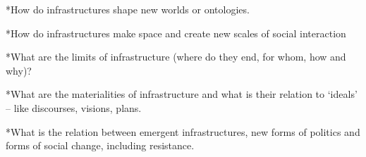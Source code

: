 \documentclass[a4,portrait,11pt]{article}
\begin{document}
\begin{flushleft}
*How do infrastructures shape new worlds or ontologies.  
\end{flushleft}


\begin{flushleft}

\end{flushleft}


\begin{flushleft}
*How do infrastructures make space and create new scales of social interaction
\end{flushleft}


\begin{flushleft}

\end{flushleft}


\begin{flushleft}
*What are the limits of infrastructure (where do they end, for whom, how and why)?
\end{flushleft}


\begin{flushleft}

\end{flushleft}


\begin{flushleft}
*What are the materialities of infrastructure and what is their relation to {`}ideals' -- like discourses, visions, plans.
\end{flushleft}


\begin{flushleft}

\end{flushleft}


\begin{flushleft}
*What is the relation between emergent infrastructures, new forms of politics and forms of social change, including resistance.
\end{flushleft}


\begin{flushleft}

\end{flushleft}


\begin{flushleft}

\end{flushleft}


\begin{flushleft}

\end{flushleft}


\begin{flushleft}
\newpage

\end{flushleft}
\end{document}
